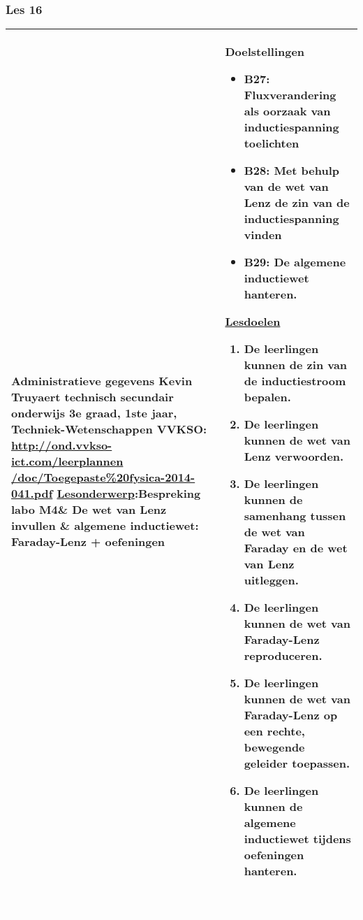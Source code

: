 


\begin{landscape}
	\subsubsection{Les 16}
	\begin{tabularx}{1.56\textwidth}{|p{}|X|}\hline
		\textbf{Administratieve gegevens}\newline\newline
		Kevin Truyaert\newline\newline
		technisch secundair onderwijs\newline
		3e graad, 1ste jaar, Techniek-Wetenschappen\newline
		VVKSO: \href{http://ond.vvkso-ict.com/leerplannen/doc/Toegepaste\%20fysica-2014-041.pdf}{http://ond.vvkso-ict.com/leerplannen /doc/Toegepaste\%20fysica-2014-041.pdf} \newline
		\underline{Lesonderwerp}:\newline Bespreking labo M4\& De wet van Lenz invullen \& algemene inductiewet: Faraday-Lenz + oefeningen & \textbf{Doelstellingen}
		\begin{itemize}[itemsep=0.08\baselineskip]
			\item B27: Fluxverandering als oorzaak van inductiespanning toelichten
			\item B28: Met behulp van de wet van Lenz de zin van de inductiespanning vinden
			\item B29: De algemene inductiewet hanteren.
		\end{itemize}
		\underline{Lesdoelen}\newline
		\vspace{-0.75cm}
		\begin{enumerate}[itemsep=0.08\baselineskip]
			\item De leerlingen kunnen de zin van de inductiestroom bepalen.
			\item De leerlingen kunnen de wet van Lenz verwoorden.
			\item De leerlingen kunnen de samenhang tussen de wet van Faraday en de wet van Lenz uitleggen.
			\item De leerlingen kunnen de wet van Faraday-Lenz reproduceren.
			\item De leerlingen kunnen de wet van Faraday-Lenz op een rechte, bewegende geleider toepassen.
			\item De leerlingen kunnen de algemene inductiewet tijdens oefeningen hanteren.
		\end{enumerate} \\\hline
	\end{tabularx}\vfill \textcolor{white}{.} 



\end{landscape}
